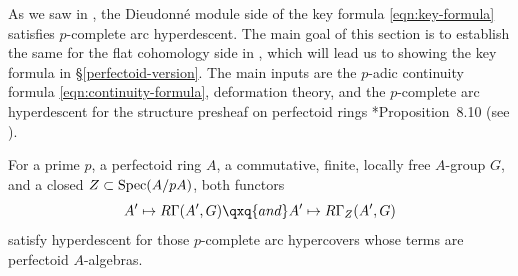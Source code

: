 \erem






























 \label{sec:descent}



As we saw in , the Dieudonn\'{e} module side of the key formula \eqref{eqn:key-formula} satisfies $p$-complete arc hyperdescent. The main goal of this section is to establish the same for the flat cohomology side in , which will lead us to showing the key formula in \S\ref{perfectoid-version}. The main inputs are the $p$-adic continuity formula \eqref{eqn:continuity-formula}, deformation theory, and the $p$-complete arc hyperdescent for the structure presheaf on perfectoid rings \cite{BS19}*{Proposition~8.10} (see ).



\bthm \label{thm:strongdescent-perfectoid}
For a prime $p$, a perfectoid ring $A$, a commutative, finite, locally free $A$-group $G$, and a closed $Z \subset \operatorname{Spec}(A/pA)$, %
both functors
\[
A' \mapsto R\Gamma(A', G) \qxq{and} A' \mapsto R\Gamma_Z(A', G) %
\]
satisfy hyperdescent for those $p$-complete arc hypercovers whose terms are perfectoid $A$-algebras.
\ethm

